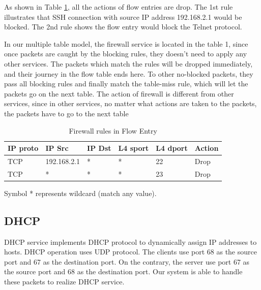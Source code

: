 \documentclass[journal]{IEEEtran}
\begin{document}
As shown in Table \ref{table:fw}, all the actions of flow entries are drop. The 1st rule illustrates that SSH connection with source IP address 192.168.2.1 would be blocked. The 2nd rule shows the flow entry would block the Telnet protocol.

In our multiple table model, the firewall service is located in the table 1, since once packets are caught by the blocking rules, they doesn't need to apply any other services. The packets which match the rules will be dropped immediately, and their journey in the flow table ends here. To other no-blocked packets, they pass all blocking rules and finally match the table-miss rule, which will let the packets go on the next table. The action of firewall is different from other services, since in other services, no matter what actions are taken to the packets, the packets have to go to the next table

\begin{table}[]
\centering
\caption{Firewall rules in Flow Entry}
\begin{threeparttable}
\label{table:fw}
\begin{tabular}{|l|l|l|l|l|l|}
\hline
IP proto & IP Src      & IP Dst       & L4 sport & L4 dport & Action \\ \hline
TCP      & 192.168.2.1 & *            & *        & 22       & Drop   \\ \hline
TCP      & *           & *            & *        & 23       & Drop   \\ \hline

\end{tabular}
\begin{tablenotes}
  \small
  \item Symbol * represents wildcard (match any value).
\end{tablenotes}
\end{threeparttable}
\end{table}

\subsection{DHCP}
DHCP service implements DHCP protocol to dynamically assign IP addresses to hosts.
DHCP operation uses UDP protocol. The clients use port 68 as the source port and 67 as the destination port.
On the contrary, the server use port 67 as the source port and 68 as the destination port.
Our system is able to handle these packets  to realize DHCP service.
\end{document}
